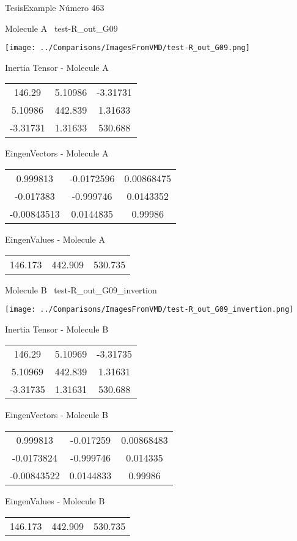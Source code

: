 \vtab[-3cm]
\begin{center}
{\large TesisExample \tab Número 463}
\end{center}
\begin{multicols}{2}
\begin{center}

Molecule A \
test-R\_out\_G09

\texttt{[image: ../Comparisons/ImagesFromVMD/test-R\_out\_G09.png]}

Inertia Tensor - Molecule A \\
\begin{tabular}{|c c c|}
146.29	 & 	5.10986	 & 	-3.31731	 \\
5.10986	 & 	442.839	 & 	1.31633	 \\
-3.31731	 & 	1.31633	 & 	530.688
\end{tabular}

\vtab
 EingenVectors - Molecule A     \\
\begin{tabular}{|c c c|}
0.999813	 & 	-0.0172596	 & 	0.00868475	 \\
-0.017383	 & 	-0.999746	 & 	0.0143352	 \\
-0.00843513	 & 	0.0144835	 & 	0.99986
\end{tabular}

\vtab
 EingenValues - Molecule A     \\
\begin{tabular}{|c c c|}
146.173	 & 	442.909	 & 	530.735	 \\
\end{tabular}
\columnbreak

Molecule B \
test-R\_out\_G09\_invertion

\texttt{[image: ../Comparisons/ImagesFromVMD/test-R\_out\_G09\_invertion.png]}

Inertia Tensor - Molecule B \\
\begin{tabular}{|c c c|}
146.29	 & 	5.10969	 & 	-3.31735	 \\
5.10969	 & 	442.839	 & 	1.31631	 \\
-3.31735	 & 	1.31631	 & 	530.688
\end{tabular}

\vtab
 EingenVectors - Molecule B     \\
\begin{tabular}{|c c c|}
0.999813	 & 	-0.017259	 & 	0.00868483	 \\
-0.0173824	 & 	-0.999746	 & 	0.014335	 \\
-0.00843522	 & 	0.0144833	 & 	0.99986
\end{tabular}

\vtab
 EingenValues - Molecule B     \\
\begin{tabular}{|c c c|}
146.173	 & 	442.909	 & 	530.735	 \\
\end{tabular}

\end{center}
\end{multicols}

